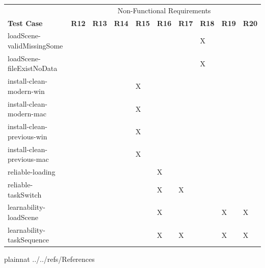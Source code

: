 \documentclass[12pt, titlepage]{article}
\begin{document}
	\begin{tabular}{|p{5cm}|l|l|l|l|l|l|l|l|l|}
		\hline
		& \multicolumn{9}{c}{Non-Functional Requirements}\\
		\textbf{Test Case} & \textbf{R12} & \textbf{R13} & \textbf{R14} & 
		\textbf{R15} & \textbf{R16} & \textbf{R17} & \textbf{R18} & 
		\textbf{R19} & 
		\textbf{R20} \\
		\hline
		loadScene-validMissingSome & & & & & & & X & & \\
		loadScene-fileExistNoData & & & & & & & X & & \\
		install-clean-modern-win & & & & X & & & &  & \\
		install-clean-modern-mac & & & & X & & & &  & \\
		install-clean-previous-win & & & & X & & & &  & \\
		install-clean-previous-mac & & & & X & & & &  & \\
		reliable-loading & & & & & X & & & & \\
		reliable-taskSwitch & & & & & X & X & & & \\
		learnability-loadScene & & & & & X & & & X & X \\
		learnability-taskSequence & & & & & X & X & & X & 
		X\\				 				
		\hline		
	\end{tabular}
				
 {plainnat}
 {../../refs/References}

\newpage
\end{document}
